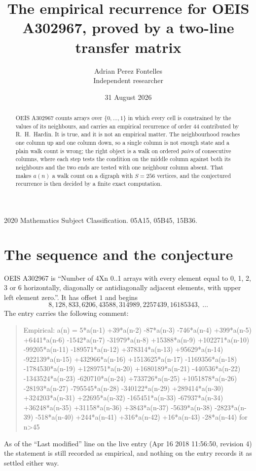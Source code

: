 \documentclass[11pt,a4paper]{article}
\title{The empirical recurrence for OEIS A302967, proved by a two-line transfer matrix}
\author{Adrian Perez Fontelles\\ \small Independent researcher}
\date{31 August 2026}
\theoremstyle{plain}
\theoremstyle{definition}
\begin{document}
\maketitle

\begin{abstract}
OEIS A302967 counts arrays over $\{0,\dots,1\}$ in which every cell is constrained by the
values of its neighbours, and carries an empirical recurrence of order $44$ contributed
by R.~H.~Hardin. It is true, and it is not an empirical matter. The neighbourhood reaches one
column up and one column down, so a single column is not enough state and a plain walk count
is wrong; the right object is a walk on ordered \emph{pairs} of consecutive columns, where
each step tests the condition on the middle column against both its neighbours and the two
ends are tested with one neighbour column absent. That makes $a(n)$ a walk count on a digraph
with $S=256$ vertices, and the conjectured recurrence is then decided by a finite exact
computation.
\end{abstract}

\noindent\small 2020 Mathematics Subject Classification. 05A15, 05B45, 15B36.\normalsize

\section{The sequence and the conjecture}

OEIS A302967 is ``Number of 4Xn 0..1 arrays with every element equal to 0, 1, 2, 3 or 6 horizontally, diagonally or antidiagonally adjacent elements, with upper left element zero.''. It has offset $1$ and begins
\[
8, 128, 833, 6206, 43588, 314989, 2257439, 16185343,\ \dots
\]
The entry carries the following comment:
\begin{quote}\small
Empirical: a(n) = 5*a(n-1) +39*a(n-2) -87*a(n-3) -746*a(n-4) +399*a(n-5) +6441*a(n-6) -1542*a(n-7) -31979*a(n-8) +15388*a(n-9) +102271*a(n-10) -99205*a(n-11) -189571*a(n-12) +378314*a(n-13) +95629*a(n-14) -922139*a(n-15) +432966*a(n-16) +1513625*a(n-17) -1169356*a(n-18) -1784530*a(n-19) +1289751*a(n-20) +1680189*a(n-21) -440536*a(n-22) -1343524*a(n-23) -620710*a(n-24) +733726*a(n-25) +1051878*a(n-26) -28193*a(n-27) -795545*a(n-28) -340122*a(n-29) +289414*a(n-30) +324203*a(n-31) +22695*a(n-32) -165451*a(n-33) -67937*a(n-34) +36248*a(n-35) +31158*a(n-36) +3843*a(n-37) -5639*a(n-38) -2823*a(n-39) -518*a(n-40) +244*a(n-41) +316*a(n-42) +16*a(n-43) -28*a(n-44) for n>45
\end{quote}
As of the ``Last modified'' line on the live entry (Apr 16 2018 11:56:50, revision 4) the statement is
still recorded as empirical, and nothing on the entry records it as settled either way.
\end{document}
